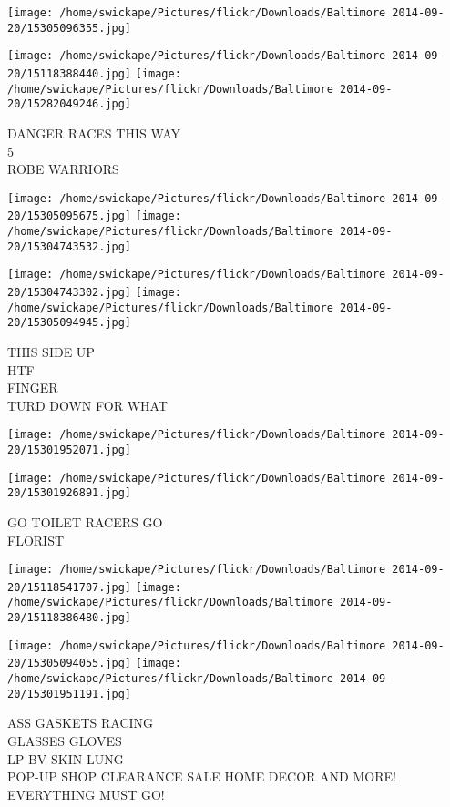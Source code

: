 \documentclass[10pt,letterpaper]{article}
\begin{document}
\texttt{[image: /home/swickape/Pictures/flickr/Downloads/Baltimore 2014-09-20/15305096355.jpg]}

\vspace{0.25in}
\texttt{[image: /home/swickape/Pictures/flickr/Downloads/Baltimore 2014-09-20/15118388440.jpg]}
\texttt{[image: /home/swickape/Pictures/flickr/Downloads/Baltimore 2014-09-20/15282049246.jpg]}

DANGER RACES THIS WAY\\
5\\
ROBE WARRIORS\\
\pagebreak

\texttt{[image: /home/swickape/Pictures/flickr/Downloads/Baltimore 2014-09-20/15305095675.jpg]}
\texttt{[image: /home/swickape/Pictures/flickr/Downloads/Baltimore 2014-09-20/15304743532.jpg]}

\texttt{[image: /home/swickape/Pictures/flickr/Downloads/Baltimore 2014-09-20/15304743302.jpg]}
\texttt{[image: /home/swickape/Pictures/flickr/Downloads/Baltimore 2014-09-20/15305094945.jpg]}

THIS SIDE UP\\
HTF\\
FINGER\\
TURD DOWN FOR WHAT\\
\pagebreak

\texttt{[image: /home/swickape/Pictures/flickr/Downloads/Baltimore 2014-09-20/15301952071.jpg]}

\vspace{0.25in}
\texttt{[image: /home/swickape/Pictures/flickr/Downloads/Baltimore 2014-09-20/15301926891.jpg]}

GO TOILET RACERS GO\\
FLORIST\\
\pagebreak

\texttt{[image: /home/swickape/Pictures/flickr/Downloads/Baltimore 2014-09-20/15118541707.jpg]}
\texttt{[image: /home/swickape/Pictures/flickr/Downloads/Baltimore 2014-09-20/15118386480.jpg]}

\texttt{[image: /home/swickape/Pictures/flickr/Downloads/Baltimore 2014-09-20/15305094055.jpg]}
\texttt{[image: /home/swickape/Pictures/flickr/Downloads/Baltimore 2014-09-20/15301951191.jpg]}

ASS GASKETS RACING\\
GLASSES GLOVES\\
LP BV SKIN LUNG\\
POP{-}UP SHOP CLEARANCE SALE HOME DECOR AND MORE! EVERYTHING MUST GO!\\
\pagebreak
\end{document}
